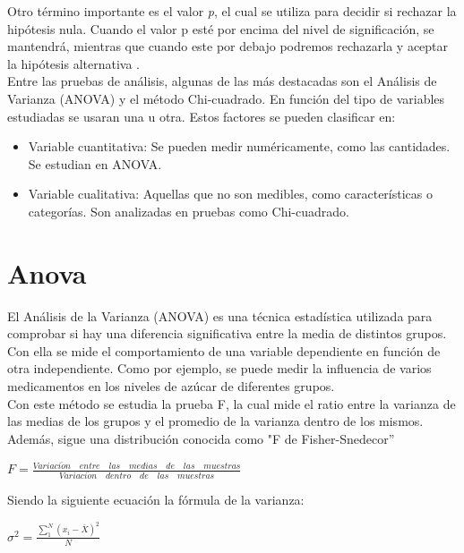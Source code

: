 Otro término importante es el valor \textit{p}, el cual se utiliza para decidir si rechazar la hipótesis nula. Cuando el valor p esté por encima del nivel de significación, se mantendrá, mientras que cuando este por debajo podremos rechazarla y aceptar la hipótesis alternativa \cite{ValorpSi12:online}.\\

Entre las pruebas de análisis, algunas de las más destacadas son el Análisis de Varianza (ANOVA) y el método Chi-cuadrado. En función del tipo de variables estudiadas se usaran una u otra. Estos factores se pueden clasificar en:
\begin{itemize}
	\item Variable cuantitativa: Se pueden medir numéricamente, como las cantidades. Se estudian en ANOVA.
	\item Variable cualitativa: Aquellas que no son medibles, como características o categorías. Son analizadas en pruebas como Chi-cuadrado.
\end{itemize}

\section{Anova}

El Análisis de la Varianza (ANOVA) es una técnica estadística utilizada para comprobar si hay una diferencia significativa entre la media de distintos grupos. Con ella se mide el comportamiento de una variable dependiente en función de otra independiente. Como por ejemplo, se puede medir la influencia de varios medicamentos en los niveles de azúcar de diferentes grupos. \cite{INFERENC93:online} \\

Con este método se estudia la prueba F, la cual mide el ratio entre la varianza de las medias de los grupos y el promedio de la varianza dentro de los mismos. Además, sigue una distribución conocida como "F de Fisher-Snedecor”

\begin{center}
	$F = \frac{Variaci\acute{o}n\quad entre\quad las\quad medias\quad de\quad las\quad muestras}{Variaci\acute{o}n\quad dentro\quad de\quad las\quad muestras}$
\end{center}

Siendo la siguiente ecuación la fórmula de la varianza:
\begin{center}
	$\sigma^{2} = \frac{\sum_{1}^{N} (x_{i}-\bar{X})^{2}}{N}$
\end{center}

